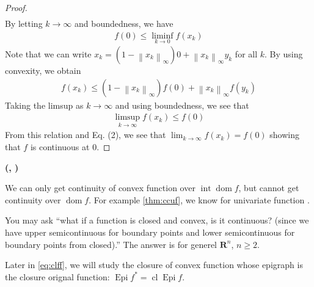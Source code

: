 \documentclass{article}
\newcommand{\bfs}[1]{\textbf{({#1}) }}
\newcommand{\cl}{\operatorname{cl}}
\newcommand{\inte}{\operatorname{int}}
\newcommand{\dom}{\operatorname{dom}}
\newcommand{\Epi}{\operatorname{Epi} }
\begin{document}
\begin{proof}
\begin{align*}
\end{align*}
By letting $k \rightarrow \infty$ and boundedness, we have
\begin{align*}
f(0) \leq \liminf _{k \rightarrow 0} f\left(x_{k}\right)
\end{align*}
Note that we can write $x_{k}=\left(1-\left\|x_{k}\right\|_{\infty}\right) 0+\left\|x_{k}\right\|_{\infty} y_{k}$ for all $k$.
By using convexity, we obtain
\begin{align*}
f\left(x_{k}\right) \leq\left(1-\left\|x_{k}\right\|_{\infty}\right) f(0)+\left\|x_{k}\right\|_{\infty} f\left(y_{k}\right)
\end{align*}
Taking the limsup as $k \rightarrow \infty$ and using boundedness, we see that
\begin{align*}
\underset{k \rightarrow \infty}{\limsup } f\left(x_{k}\right) \leq f(0)
\end{align*}
From this relation and Eq. (2), we see that  $\lim _{k \rightarrow \infty} f\left(x_{k}\right)=f(0)$ showing that $f$ is continuous at 0.
\end{proof}

\begin{rema}\bfs{{}, {\tb{closed $\not\Longrightarrow$ convex}}}

We can only get continuity of convex function over $\inte \dom f$, but cannot get continuity over $\dom f$. For example \cref{thm:ccuf}, we know for univariate function . 

You may ask ``what if a function is closed and convex, is it continuous? (since we have upper semicontinuous for boundary points and lower semicontinuous for boundary points from closed).'' The answer is  for generel $\mathbf{R}^n$, $n\ge 2$. 
\end{rema}

Later in \cref{eq:clff}, we will study the closure of convex function whose epigraph is the closure orignal function: $\Epi f^* =\cl \Epi f$. 
\end{document}
